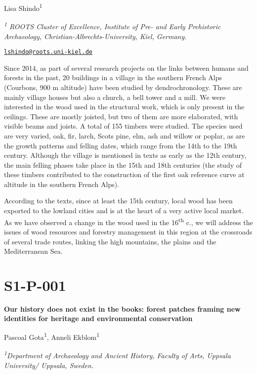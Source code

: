 \documentclass[
]{book}
\begin{document}
Lisa Shindo\textsuperscript{1}

\emph{\textsuperscript{1} ROOTS Cluster of Excellence, Institute of Pre- and Early Prehistoric Archaeology, Christian-Albrechts-University, Kiel, Germany.}

\href{mailto:lshindo@roots.uni-kiel.de}{\nolinkurl{lshindo@roots.uni-kiel.de}}

Since 2014, as part of several research projects on the links between humans and forests in the past, 20 buildings in a village in the southern French Alps (Courbons, 900 m altitude) have been studied by dendrochronology. These are mainly village houses but also a church, a bell tower and a mill. We were interested in the wood used in the structural work, which is only present in the ceilings. These are mostly joisted, but two of them are more elaborated, with visible beams and joists. A total of 155 timbers were studied. The species used are very varied, oak, fir, larch, Scots pine, elm, ash and willow or poplar, as are the growth patterns and felling dates, which range from the 14th to the 19th century. Although the village is mentioned in texts as early as the 12th century, the main felling phases take place in the 15th and 18th centuries (the study of these timbers contributed to the construction of the first oak reference curve at altitude in the southern French Alps).

According to the texts, since at least the 15th century, local wood has been exported to the lowland cities and is at the heart of a very active local market. As we have observed a change in the wood used in the 16\textsuperscript{th} c., we will address the issues of wood resources and forestry management in this region at the crossroads of several trade routes, linking the high mountains, the plains and the Mediterranean Sea.

\hypertarget{s1-p-001}{%
\section*{S1-P-001}\label{s1-p-001}}

\textbf{Our history does not exist in the books: forest patches framing new identities for heritage and environmental conservation}

Pascoal Gota\textsuperscript{1}, Anneli Ekblom\textsuperscript{1}

\emph{\textsuperscript{1}Department of Archaeology and Ancient History, Faculty of Arts, Uppsala University/ Uppsala, Sweden.}
\end{document}
